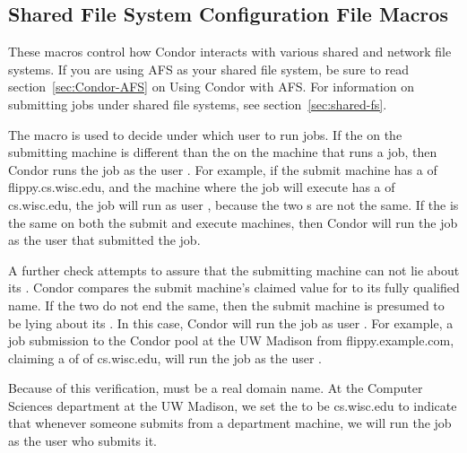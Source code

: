 \subsection{\label{sec:Shared-Filesystem-Config-File-Entries}Shared File System Configuration File Macros} 

These macros control how Condor interacts with various shared and
network file systems.  If you are using AFS as your shared file system,
be sure to read section~\ref{sec:Condor-AFS} on Using Condor with
AFS.
For information on submitting jobs under shared file systems,
see
section~\ref{sec:shared-fs}.
\begin{description}

\label{param:UidDomain}
\item[\Macro{UID\_DOMAIN}]
  The  macro
  is used to decide under which user to run jobs.
  If the 
  on the submitting machine is different than
  the 
  on the machine that runs a job, then Condor runs
  the job as the user .
  For example, if the submit machine has
  a  of
  flippy.cs.wisc.edu, and the machine where the job will execute
  has a  of
  cs.wisc.edu, the job will run as user , because
  the two s are not the same.
  If the 
  is the same on both the submit and execute machines,
  then Condor will run the job as the user that submitted the job.

  A further check attempts to assure that the submitting
  machine can not lie about its .
  Condor compares the 
  submit machine's claimed value for 
  to its fully qualified name.
  If the two do not end the same, then the submit machine
  is presumed to be lying about its .
  In this case, Condor will run the job as user .
  For example, a job submission to the Condor pool at the UW Madison
  from flippy.example.com, claiming a  of
  of cs.wisc.edu,
  will run the job as the user .

  Because of this verification,
   must be a real domain name.
  At the Computer Sciences department
  at the UW Madison, we set the 
  to be cs.wisc.edu to
  indicate that whenever someone submits from a department machine, we
  will run the job as the user who submits it.


\end{description}
